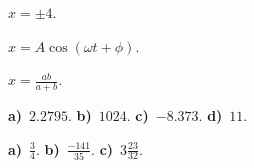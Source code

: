 \begin{Answer}{1.1}
$x=\pm 4$.
\end{Answer}
\begin{Answer}{1.2}
$x=A\cos(\omega t+\phi)$.
\end{Answer}
\begin{Answer}{1.3}
$x=\frac{ab}{a+b}$.
\end{Answer}
\begin{Answer}{1.4}
\textbf{a)}~$2.2795$.
					\textbf{b)}~$1024$.
					\textbf{c)}~$-8.373$.
					\textbf{d)}~$11$.
\end{Answer}
\begin{Answer}{1.5}
\textbf{a)}~$\frac{3}{4}$.
					\textbf{b)}~$\frac{-141}{35}$.
					\textbf{c)}~$3\frac{23}{32}$.
\end{Answer}
